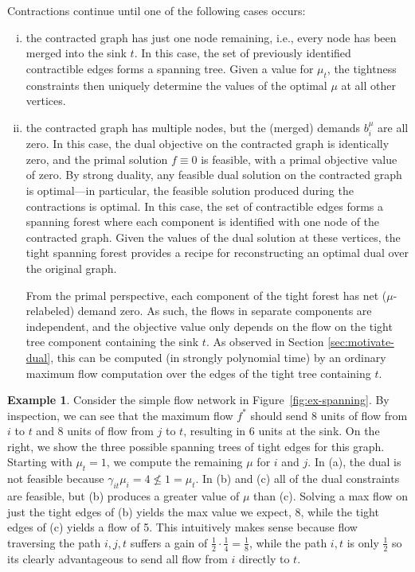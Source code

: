 \documentclass[11pt]{article}
\theoremstyle{definition}
\theoremstyle{definition}
\theoremstyle{definition}
\newtheorem{example}{Example}[section]
\newcommand{\biu}{b_{i}^{\mu}}
\begin{document}
	Contractions continue until one of the following cases occurs:
	\begin{enumerate}[(i),itemsep=0mm]
	\item the contracted graph has just one node remaining, i.e., every node has been merged
	into the sink $t$. In this case, the set of previously identified
	contractible edges forms a spanning tree. Given a value for $\mu_t$, the tightness
	constraints then uniquely determine the values of the optimal $\mu$ at all other vertices.
	
	\item the contracted graph has multiple nodes, but the (merged)
	demands $\biu$ are all zero. In this case, the dual objective on the contracted
	graph is identically zero, and the primal solution $f \equiv 0$ is feasible,
	with a primal objective value of zero. By strong duality, any feasible dual
	solution on the contracted graph is optimal---in particular, the feasible
	solution produced during the contractions is optimal.
	In this case, the set of contractible edges
	forms a spanning forest where each component is identified with one node
	of the contracted graph. Given the values of the dual solution at these vertices,
	the tight spanning forest provides a recipe for reconstructing
	an optimal dual over the original graph.
	
	From the primal perspective, each component of the tight forest has net ($\mu$-relabeled)
	demand zero. As such, the flows in separate components are independent, and the objective
	value only depends on the flow on the tight tree component containing the sink $t$.
	As observed in Section \ref{sec:motivate-dual}, this
	can be computed (in strongly polynomial time)
	by an ordinary maximum flow computation over the edges of the tight tree containing $t$.
	\end{enumerate}
    
	\begin{example}
	Consider the simple flow network in
	Figure~\ref{fig:ex-spanning}. By inspection, we can see that the maximum flow $f^{*}$
	should send 8 units of flow from $i$ to $t$ and 8 units of flow from $j$ to $t$,
	resulting in 6 units at the sink. On the right, we show the three possible spanning
	trees of tight edges for this graph. Starting with $\mu_t = 1$, we compute the remaining $\mu$
	for $i$ and $j$. In (a), the dual is not feasible because $\gamma_{it}\mu_i = 4 \nleq 1 = \mu_t$.
	In (b) and (c) all of the dual constraints are feasible, but (b) produces a greater value of $\mu$
	than (c). Solving a max flow on just the tight edges of (b) yields the max value we expect, 8, while the tight edges of (c) yields a flow of 5. This intuitively makes sense because flow traversing the path $i,j,t$ suffers a gain of $\frac{1}{2}\cdot\frac{1}{4}=\frac{1}{8}$, while the path $i,t$ is only $\frac{1}{2}$ so its clearly advantageous to send all flow from $i$ directly to $t$.
\end{example}
\end{document}
